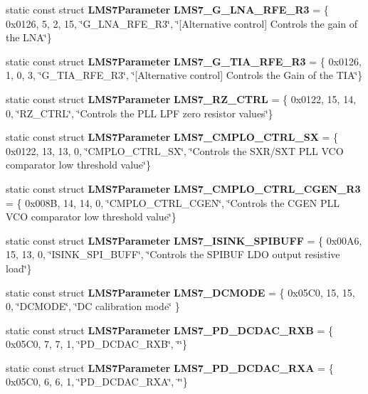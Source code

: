\begin{DoxyCompactItemize}
\item 
static const struct {\bf L\+M\+S7\+Parameter} {\bf L\+M\+S7\+\_\+\+G\+\_\+\+L\+N\+A\+\_\+\+R\+F\+E\+\_\+\+R3} = \{ 0x0126, 5, 2, 15, \char`\"{}\+G\+\_\+\+L\+N\+A\+\_\+\+R\+F\+E\+\_\+\+R3\char`\"{}, \char`\"{}[\+Alternative control] Controls the gain of the L\+N\+A\char`\"{}\}
\item 
static const struct {\bf L\+M\+S7\+Parameter} {\bf L\+M\+S7\+\_\+\+G\+\_\+\+T\+I\+A\+\_\+\+R\+F\+E\+\_\+\+R3} = \{ 0x0126, 1, 0, 3, \char`\"{}\+G\+\_\+\+T\+I\+A\+\_\+\+R\+F\+E\+\_\+\+R3\char`\"{}, \char`\"{}[\+Alternative control] Controls the Gain of the T\+I\+A\char`\"{}\}
\item 
static const struct {\bf L\+M\+S7\+Parameter} {\bf L\+M\+S7\+\_\+\+R\+Z\+\_\+\+C\+T\+RL} = \{ 0x0122, 15, 14, 0, \char`\"{}\+R\+Z\+\_\+\+C\+T\+R\+L\char`\"{}, \char`\"{}\+Controls the P\+L\+L L\+P\+F zero resistor values\char`\"{}\}
\item 
static const struct {\bf L\+M\+S7\+Parameter} {\bf L\+M\+S7\+\_\+\+C\+M\+P\+L\+O\+\_\+\+C\+T\+R\+L\+\_\+\+SX} = \{ 0x0122, 13, 13, 0, \char`\"{}\+C\+M\+P\+L\+O\+\_\+\+C\+T\+R\+L\+\_\+\+S\+X\char`\"{}, \char`\"{}\+Controls the S\+X\+R/\+S\+X\+T P\+L\+L V\+C\+O comparator low threshold value\char`\"{}\}
\item 
static const struct {\bf L\+M\+S7\+Parameter} {\bf L\+M\+S7\+\_\+\+C\+M\+P\+L\+O\+\_\+\+C\+T\+R\+L\+\_\+\+C\+G\+E\+N\+\_\+\+R3} = \{ 0x008\+B, 14, 14, 0, \char`\"{}\+C\+M\+P\+L\+O\+\_\+\+C\+T\+R\+L\+\_\+\+C\+G\+E\+N\char`\"{}, \char`\"{}\+Controls the C\+G\+E\+N P\+L\+L V\+C\+O comparator low threshold value\char`\"{}\}
\item 
static const struct {\bf L\+M\+S7\+Parameter} {\bf L\+M\+S7\+\_\+\+I\+S\+I\+N\+K\+\_\+\+S\+P\+I\+B\+U\+FF} = \{ 0x00\+A6, 15, 13, 0, \char`\"{}\+I\+S\+I\+N\+K\+\_\+\+S\+P\+I\+\_\+\+B\+U\+F\+F\char`\"{}, \char`\"{}\+Controls the S\+P\+I\+B\+U\+F L\+D\+O output resistive load\char`\"{}\}
\item 
static const struct {\bf L\+M\+S7\+Parameter} {\bf L\+M\+S7\+\_\+\+D\+C\+M\+O\+DE} = \{ 0x05\+C0, 15, 15, 0, \char`\"{}\+D\+C\+M\+O\+D\+E\char`\"{}, \char`\"{}\+D\+C calibration mode\char`\"{} \}
\item 
static const struct {\bf L\+M\+S7\+Parameter} {\bf L\+M\+S7\+\_\+\+P\+D\+\_\+\+D\+C\+D\+A\+C\+\_\+\+R\+XB} = \{ 0x05\+C0, 7, 7, 1, \char`\"{}\+P\+D\+\_\+\+D\+C\+D\+A\+C\+\_\+\+R\+X\+B\char`\"{}, \char`\"{}\char`\"{}\}
\item 
static const struct {\bf L\+M\+S7\+Parameter} {\bf L\+M\+S7\+\_\+\+P\+D\+\_\+\+D\+C\+D\+A\+C\+\_\+\+R\+XA} = \{ 0x05\+C0, 6, 6, 1, \char`\"{}\+P\+D\+\_\+\+D\+C\+D\+A\+C\+\_\+\+R\+X\+A\char`\"{}, \char`\"{}\char`\"{}\}

\end{DoxyCompactItemize}
